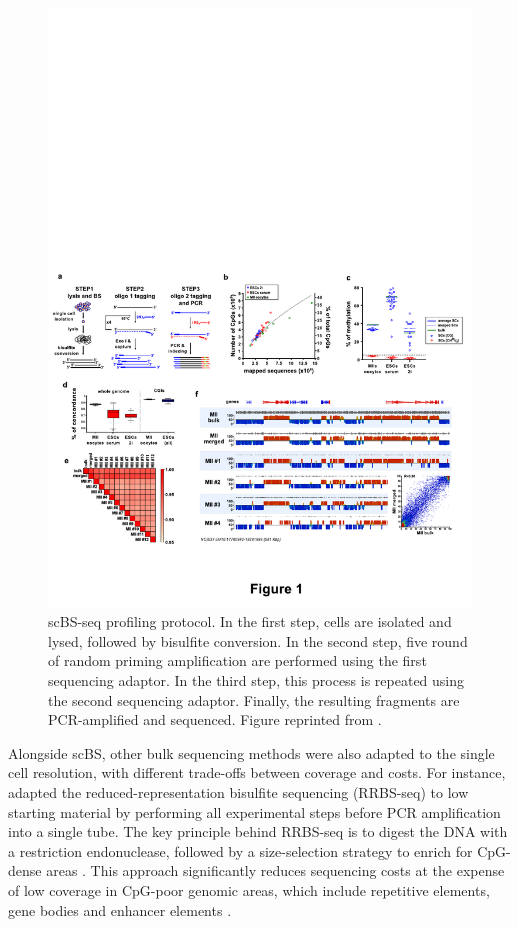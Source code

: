\begin{figure}[H]
	\centering
	\includegraphics[width=0.8\linewidth]{scBS_protocol}
	\caption[]{scBS-seq profiling protocol. In the first step, cells are isolated and lysed, followed by bisulfite conversion. In the second step, five round of random priming amplification are performed using the first sequencing adaptor. In the third step, this process is repeated using the second sequencing adaptor. Finally, the resulting fragments are PCR-amplified and sequenced. Figure reprinted from \cite{Smallwood2014}.}
	\label{fig:scBS}
\end{figure}

Alongside scBS, other bulk sequencing methods were also adapted to the single cell resolution, with different trade-offs between coverage and costs. For instance, \cite{Guo2015} adapted the reduced-representation bisulfite sequencing (RRBS-seq) to low starting material by performing all experimental steps before PCR amplification into a single tube. The key principle behind RRBS-seq is to digest the DNA with a restriction endonuclease, followed by a size-selection strategy to enrich for CpG-dense areas \cite{Meissner2005}. This approach significantly reduces sequencing costs at the expense of low coverage in CpG-poor genomic areas, which include repetitive elements, gene bodies and enhancer elements \cite{Martin-Herranz2017}.\\

